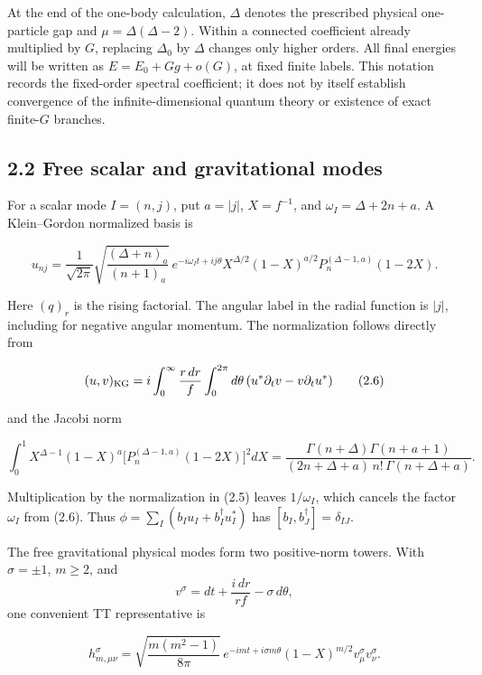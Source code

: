 \documentclass[a4paper,11pt]{article}
\numberwithin{equation}{section}
\begin{document}
At the end of the one-body calculation, \(\Delta\) denotes the prescribed physical one-particle gap and \(\mu=\Delta(\Delta-2)\). Within a connected coefficient already multiplied by \(G\), replacing \(\Delta_0\) by \(\Delta\) changes only higher orders. All final energies will be written as \(E=E_0+Gg+o(G)\), at fixed finite labels. This notation records the fixed-order spectral coefficient; it does not by itself establish convergence of the infinite-dimensional quantum theory or existence of exact finite-\(G\) branches.

\hypertarget{free-scalar-and-gravitational-modes}{%
\subsection{2.2 Free scalar and gravitational modes}\label{free-scalar-and-gravitational-modes}}

For a scalar mode \(I=(n,j)\), put \(a=|j|\), \(X=f^{-1}\), and \(\omega_I=\Delta+2n+a\). A Klein--Gordon normalized basis is

\[
u_{nj}=
\frac1{\sqrt{2\pi}}
\sqrt{\frac{(\Delta+n)_a}{(n+1)_a}}\,
e^{-i\omega_I t+ij\theta}
X^{\Delta/2}(1-X)^{a/2}
P_n^{(\Delta-1,a)}(1-2X).
\tag{2.5}
\]

Here \((q)_r\) is the rising factorial. The angular label in the radial function is \(|j|\), including for negative angular momentum. The normalization follows directly from

\[
(u,v)_{\rm KG}
=i\int_0^\infty\frac{r\,dr}{f}\int_0^{2\pi}d\theta\,
(u^*\partial_tv-v\partial_tu^*)
\tag{2.6}
\]

and the Jacobi norm

\[
\int_0^1 X^{\Delta-1}(1-X)^a
\bigl[P_n^{(\Delta-1,a)}(1-2X)\bigr]^2dX
=
\frac{\Gamma(n+\Delta)\Gamma(n+a+1)}
{(2n+\Delta+a)\,n!\,\Gamma(n+\Delta+a)}.
\tag{2.7}
\]

Multiplication by the normalization in (2.5) leaves \(1/\omega_I\), which cancels the factor \(\omega_I\) from (2.6). Thus \(\phi=\sum_I(b_Iu_I+b_I^\dagger u_I^*)\) has \([b_I,b_J^\dagger]=\delta_{IJ}\).

The free gravitational physical modes form two positive-norm towers. With \(\sigma=\pm1\), \(m\ge2\), and \[
v^\sigma=dt+\frac{i\,dr}{rf}-\sigma\,d\theta ,
\] one convenient TT representative is

\[
h^\sigma_{m,\mu\nu}
=\sqrt{\frac{m(m^2-1)}{8\pi}}\,
e^{-imt+i\sigma m\theta}
(1-X)^{m/2}v^\sigma_\mu v^\sigma_\nu .
\tag{2.8}
\]
\end{document}
